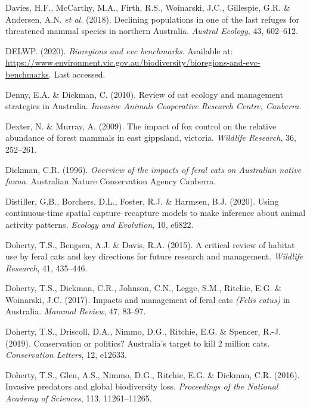 \documentclass[11pt,a4paper,titlepage,twoside,openright]{style/unimelbthesis}
\begin{document}
\begin{mainmatter}
\leavevmode\hypertarget{ref-davies2018declining}{}%
Davies, H.F., McCarthy, M.A., Firth, R.S., Woinarski, J.C., Gillespie, G.R. \& Andersen, A.N. \emph{et al.} (2018). Declining populations in one of the last refuges for threatened mammal species in northern Australia. \emph{Austral Ecology}, 43, 602--612.

\leavevmode\hypertarget{ref-delwp2020}{}%
DELWP. (2020). \emph{Bioregions and evc benchmarks}. Available at: \url{https://www.environment.vic.gov.au/biodiversity/bioregions-and-evc-benchmarks}. Last accessed.

\leavevmode\hypertarget{ref-denny2010review}{}%
Denny, E.A. \& Dickman, C. (2010). Review of cat ecology and management strategies in Australia. \emph{Invasive Animals Cooperative Research Centre, Canberra}.

\leavevmode\hypertarget{ref-dexter2009impact}{}%
Dexter, N. \& Murray, A. (2009). The impact of fox control on the relative abundance of forest mammals in east gippsland, victoria. \emph{Wildlife Research}, 36, 252--261.

\leavevmode\hypertarget{ref-dickman1996overview}{}%
Dickman, C.R. (1996). \emph{Overview of the impacts of feral cats on Australian native fauna}. Australian Nature Conservation Agency Canberra.

\leavevmode\hypertarget{ref-distiller2020using}{}%
Distiller, G.B., Borchers, D.L., Foster, R.J. \& Harmsen, B.J. (2020). Using continuous-time spatial capture--recapture models to make inference about animal activity patterns. \emph{Ecology and Evolution}, 10, e6822.

\leavevmode\hypertarget{ref-doherty2015critical}{}%
Doherty, T.S., Bengsen, A.J. \& Davis, R.A. (2015). A critical review of habitat use by feral cats and key directions for future research and management. \emph{Wildlife Research}, 41, 435--446.

\leavevmode\hypertarget{ref-doherty2017impacts}{}%
Doherty, T.S., Dickman, C.R., Johnson, C.N., Legge, S.M., Ritchie, E.G. \& Woinarski, J.C. (2017). Impacts and management of feral cats \emph{(Felis catus)} in Australia. \emph{Mammal Review}, 47, 83--97.

\leavevmode\hypertarget{ref-doherty2019conservation}{}%
Doherty, T.S., Driscoll, D.A., Nimmo, D.G., Ritchie, E.G. \& Spencer, R.-J. (2019). Conservation or politics? Australia's target to kill 2 million cats. \emph{Conservation Letters}, 12, e12633.

\leavevmode\hypertarget{ref-doherty2016invasive}{}%
Doherty, T.S., Glen, A.S., Nimmo, D.G., Ritchie, E.G. \& Dickman, C.R. (2016). Invasive predators and global biodiversity loss. \emph{Proceedings of the National Academy of Sciences}, 113, 11261--11265.


\end{mainmatter}
\end{document}
